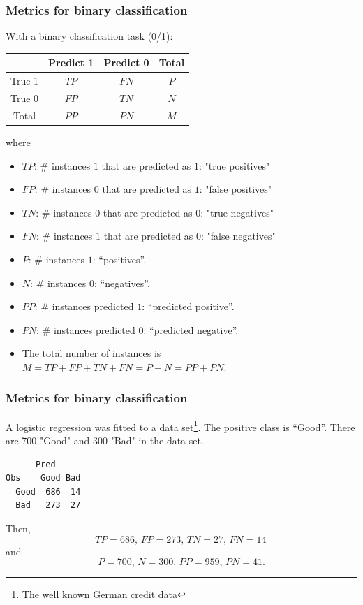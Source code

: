 \begin{frame}
\frametitle{Metrics for binary classification}
With a binary classification task (0/1):
\begin{center}
\begin{tabular}{|c|c|c||c|}
\hline
& Predict 1 & Predict 0 & Total \\
\hline
True 1 & $TP$ & $FN$ & $P$\\
\hline
True 0 & $FP$ & $TN$ & $N$ \\
\hline
\hline
Total & $PP$ & $PN$ & $M$\\
\hline
\end{tabular}
\end{center}
where\\
\scriptsize
\begin{itemize}
\item $TP$: $\#$ instances $1$ that are predicted as $1$: "true positives"
\item $FP$: $\#$ instances $0$ that are predicted as $1$: "false positives"
\item $TN$: $\#$ instances $0$ that are predicted as $0$: "true negatives"
\item $FN$: $\#$ instances $1$ that are predicted as $0$: "false negatives"
\item $P$: $\#$ instances $1$: ``positives''.
\item $N$: $\#$ instances $0$: ``negatives''.
\item $PP$: $\#$ instances predicted $1$: ``predicted positive''.
\item $PN$: $\#$ instances predicted $0$: ``predicted negative''.
\item The total number of instances is $M=TP+FP+TN+FN=P+N=PP+PN$.
\end{itemize}
\end{frame}
\begin{frame}[fragile]
\frametitle{Metrics for binary classification}
A logistic regression was fitted to a data set\footnote{The well known German credit data}. The positive class is ``Good''. There are 700 "Good" and 300 "Bad" in the data set.\\
\scriptsize
\begin{verbatim}
      Pred
Obs    Good Bad
  Good  686  14
  Bad   273  27
\end{verbatim}
\normalsize
Then,
$$
TP=686, \, FP=273, \, TN=27, \, FN=14\, 
$$
and
$$
P=700, \, N=300, \, PP=959, \, PN=41.
$$
\end{frame}
